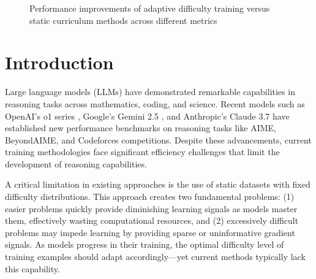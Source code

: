 \begin{figure}[H]
    \centering
    \caption{Performance improvements of adaptive difficulty training versus static curriculum methods across different metrics}
    \label{fig:performance-comparison}
\end{figure}


\section{Introduction}
Large language models (LLMs) have demonstrated remarkable capabilities in reasoning tasks across mathematics, coding, and science. Recent models such as OpenAI's o1 series \cite{openai2023gpt4}, Google's Gemini 2.5 \cite{google2023gemini}, and Anthropic's Claude 3.7 \cite{anthropic2023claude} have established new performance benchmarks on reasoning tasks like AIME, BeyondAIME, and Codeforces competitions. Despite these advancements, current training methodologies face significant efficiency challenges that limit the development of reasoning capabilities.

A critical limitation in existing approaches is the use of static datasets with fixed difficulty distributions. This approach creates two fundamental problems: (1) easier problems quickly provide diminishing learning signals as models master them, effectively wasting computational resources, and (2) excessively difficult problems may impede learning by providing sparse or uninformative gradient signals. As models progress in their training, the optimal difficulty level of training examples should adapt accordingly—yet current methods typically lack this capability.

